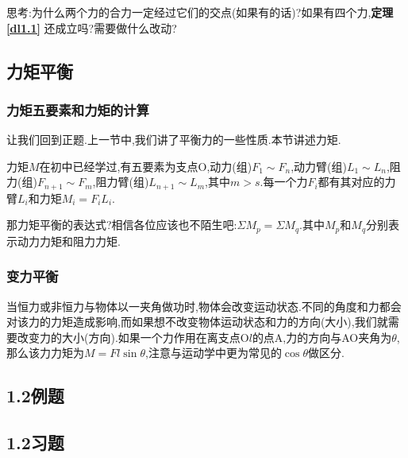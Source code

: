 { 思考:为什么两个力的合力一定经过它们的交点(如果有的话)?如果有四个力,}\textbf{定理\ref{dl1.1}}{ 还成立吗?需要做什么改动?}
\subsection{力矩平衡}
\subsubsection{力矩五要素和力矩的计算}
让我们回到正题.上一节中,我们讲了平衡力的一些性质.本节讲述力矩.


力矩$M$在初中已经学过,有五要素为支点O,动力(组)$F_1\sim F_n$,动力臂(组)$L_1\sim L_n$,阻力(组)$F_{n+1}\sim F_m$,阻力臂(组)$L_{n+1}\sim L_m$,其中$m>s$.每一个力$F_i$都有其对应的力臂$L_i$和力矩$M_i=F_iL_i$.


那力矩平衡的表达式?相信各位应该也不陌生吧:$\Sigma M_p=\Sigma M_q$.其中$M_p$和$M_q$分别表示动力力矩和阻力力矩.
\subsubsection{变力平衡}
当恒力或非恒力与物体以一夹角做功时,物体会改变运动状态.不同的角度和力都会对该力的力矩造成影响,而如果想不改变物体运动状态和力的方向(大小),我们就需要改变力的大小(方向).如果一个力作用在离支点O$l$的点A,力的方向与AO夹角为$\theta$,那么该力力矩为$M=Fl\sin\theta$,注意与运动学中更为常见的$\cos\theta$做区分.
\subsection{1.2例题}
\subsection{1.2习题}